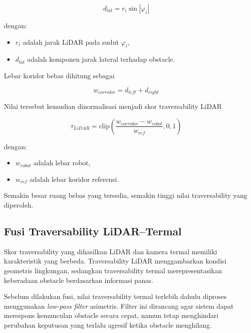 \begin{equation}
d_{lat}=r_i\sin|\varphi_i|
\label{eq:lateral_distance}
\end{equation}

dengan:

\begin{itemize}
\item $r_i$ adalah jarak LiDAR pada sudut $\varphi_i$,
\item $d_{lat}$ adalah komponen jarak lateral terhadap obstacle.
\end{itemize}

Lebar koridor bebas dihitung sebagai

\begin{equation}
w_{corridor}=d_{left}+d_{right}
\label{eq:corridor_width}
\end{equation}

Nilai tersebut kemudian dinormalisasi menjadi skor traversability LiDAR

\begin{equation}
\tau_{LiDAR}
=
\mathrm{clip}
\left(
\frac{w_{corridor}-w_{robot}}
{w_{ref}},
0,
1
\right)
\label{eq:trav_lidar}
\end{equation}

dengan:

\begin{itemize}
\item $w_{robot}$ adalah lebar robot,
\item $w_{ref}$ adalah lebar koridor referensi.
\end{itemize}

Semakin besar ruang bebas yang tersedia, semakin tinggi nilai traversability yang diperoleh.

\subsection{Fusi Traversability LiDAR--Termal}

Skor traversability yang dihasilkan LiDAR dan kamera termal memiliki karakteristik yang berbeda. Traversability LiDAR menggambarkan kondisi geometris lingkungan, sedangkan traversability termal merepresentasikan keberadaan obstacle berdasarkan informasi panas.

Sebelum dilakukan fusi, nilai traversability termal terlebih dahulu diproses menggunakan \textit{low-pass filter} asimetris. Filter ini dirancang agar sistem dapat merespons kemunculan obstacle secara cepat, namun tetap menghindari perubahan keputusan yang terlalu agresif ketika obstacle menghilang.

